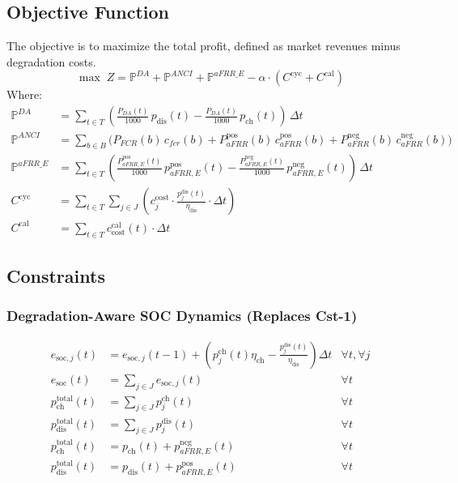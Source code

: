 \documentclass[11pt, a4paper]{article}
\begin{document}
\subsection{Objective Function}
The objective is to maximize the total profit, defined as market revenues minus degradation costs.
\begin{equation}
\max \; Z = \mathbb{P}^{DA} + \mathbb{P}^{ANCI} + \mathbb{P}^{aFRR\_E} - \alpha \cdot (C^{\mathrm{cyc}} + C^{\mathrm{cal}})
\end{equation}
Where:
\begin{align}
\mathbb{P}^{DA} &= \sum_{t\in T} \left( \frac{P_{DA}(t)}{1000}\, p_{\mathrm{dis}}(t) - \frac{P_{DA}(t)}{1000}\, p_{\mathrm{ch}}(t) \right)\, \Delta t \\
\mathbb{P}^{ANCI} &= \sum_{b\in B} \Big( P_{FCR}(b)\, c_{fcr}(b) + P^{\mathrm{pos}}_{aFRR}(b)\, c^{\mathrm{pos}}_{aFRR}(b) + P^{\mathrm{neg}}_{aFRR}(b)\, c^{\mathrm{neg}}_{aFRR}(b) \Big) \\
\mathbb{P}^{aFRR\_E} &= \sum_{t\in T} \left( \frac{P^{\mathrm{pos}}_{aFRR, E}(t)}{1000}\, p^{\mathrm{pos}}_{aFRR, E}(t) - \frac{P^{\mathrm{neg}}_{aFRR, E}(t)}{1000}\, p^{\mathrm{neg}}_{aFRR, E}(t) \right)\, \Delta t \\
C^{\mathrm{cyc}} &= \sum_{t \in T} \sum_{j \in J} \left( c^{\mathrm{cost}}_{j} \cdot \frac{p^{\mathrm{dis}}_{j}(t)}{\eta_{\mathrm{dis}}} \cdot \Delta t \right) \\
C^{\mathrm{cal}} &= \sum_{t \in T} c^{\mathrm{cal}}_{\mathrm{cost}}(t) \cdot \Delta t
\end{align}

\subsection{Constraints}

\subsubsection{Degradation-Aware SOC Dynamics (Replaces Cst-1)}
\begin{align}
e_{\mathrm{soc},j}(t) &= e_{\mathrm{soc},j}(t-1) + \left( p^{\mathrm{ch}}_{j}(t) \eta_{\mathrm{ch}} - \frac{p^{\mathrm{dis}}_{j}(t)}{\eta_{\mathrm{dis}}} \right) \Delta t & \forall t, \forall j \\
e_{\mathrm{soc}}(t) &= \sum_{j \in J} e_{\mathrm{soc},j}(t) & \forall t \\
p^{\mathrm{total}}_{\mathrm{ch}}(t) &= \sum_{j \in J} p^{\mathrm{ch}}_{j}(t) & \forall t \\
p^{\mathrm{total}}_{\mathrm{dis}}(t) &= \sum_{j \in J} p^{\mathrm{dis}}_{j}(t) & \forall t \\
p^{\mathrm{total}}_{\mathrm{ch}}(t) &= p_{\mathrm{ch}}(t) + p^{\mathrm{neg}}_{aFRR,E}(t) & \forall t \\
p^{\mathrm{total}}_{\mathrm{dis}}(t) &= p_{\mathrm{dis}}(t) + p^{\mathrm{pos}}_{aFRR,E}(t) & \forall t
\end{align}
\end{document}
